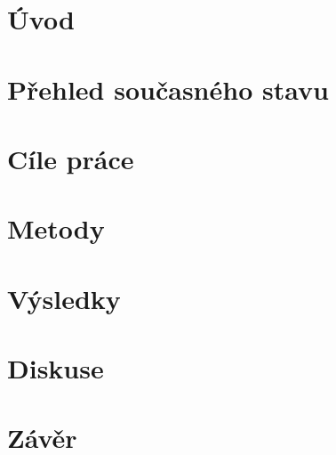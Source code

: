 \documentclass[a4paper,12pt]{article}   %
\numberwithin{equation}{section}        %
\begin{document}
	    \listoftables 		%
	
	   \clearpage 			%
		
	  \listoffigures 		%
	  \clearpage
	
	
	
	\section{Úvod}
	
	\clearpage
	
	\section{Přehled současného stavu}
	
	\clearpage
	
      \section{Cíle práce}
	
	\clearpage
	
	\section{Metody}
	
	\clearpage
	
	\section{Výsledky}
	
	\clearpage
	
	\section{Diskuse}
	
	\clearpage
	
	\section{Závěr}
	
	\clearpage

    \clearpage	
    \renewcommand{\refname}{Seznam použité literatury} 	%
    \printbibliography
    \clearpage

  
    
\end{document}

